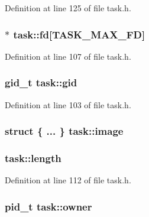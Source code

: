 Definition at line 125 of file task.\+h.

\hypertarget{structtask_afeeb6bafaefe505e6a730dd4e0be5a1a}{
\subsubsection[{fd}]{$\ast$ task\+::fd\mbox{[}{\bf T\+A\+S\+K\+\_\+\+M\+A\+X\+\_\+\+F\+D}\mbox{]}}}\label{structtask_afeeb6bafaefe505e6a730dd4e0be5a1a}


Definition at line 107 of file task.\+h.

\hypertarget{structtask_aaf3b6e15445e766a5c4823b815bca630}{
\subsubsection[{gid}]{\setlength{\rightskip}{0pt plus 5cm}gid\+\_\+t task\+::gid}}\label{structtask_aaf3b6e15445e766a5c4823b815bca630}


Definition at line 103 of file task.\+h.

\hypertarget{structtask_a3eac6c8a544ff49a836c5eed9ec48107}{
\subsubsection[{image}]{\setlength{\rightskip}{0pt plus 5cm}struct \{ ... \}   task\+::image}}\label{structtask_a3eac6c8a544ff49a836c5eed9ec48107}
\hypertarget{structtask_aa90dc3e7e232d6ba3f04700b3197b366}{
\subsubsection[{length}]{ task\+::length}}\label{structtask_aa90dc3e7e232d6ba3f04700b3197b366}


Definition at line 112 of file task.\+h.

\hypertarget{structtask_a34a5abdae35b067ec6cde7fc81a43598}{
\subsubsection[{owner}]{\setlength{\rightskip}{0pt plus 5cm}pid\+\_\+t task\+::owner}}\label{structtask_a34a5abdae35b067ec6cde7fc81a43598}


